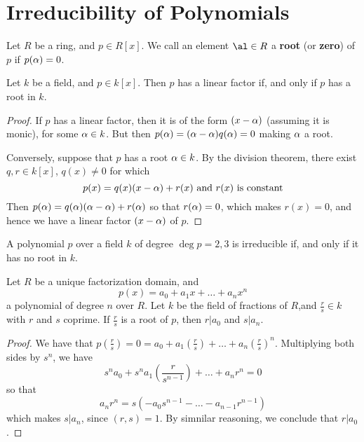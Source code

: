 \section{Irreducibility of Polynomials}
\label{section_7.3}

\begin{definition}
    Let $R$ be a ring, and  $p \in R[x]$. We call an element $\al \in R$ a
    \textbf{root} (or \textbf{zero}) of $p$ if  $p(\alpha)=0$.
\end{definition}

\begin{lemma}\label{lemma_7.3.1}
    Let $k$ be a field, and  $p \in k[x]$. Then $p$ has a linear factor if, and
    only if  $p$ has a root in  $k$.
\end{lemma}
\begin{proof}
    If $p$ has a linear factor, then it is of the form  $(x-\alpha)$ (assuming it is
    monic), for some $\alpha \in k$. But then  $p(\alpha)=(\alpha-\alpha)q(\alpha)=0$ making $\alpha$ a
    root.

    Conversely, suppose that $p$ has a root  $\alpha \in k$. By the division
    theorem, there exist $q, r \in k[x]$, $q(x) \neq 0$ for which
    \begin{equation*}
        p(x)=q(x)(x-\alpha)+r(x) \text{ and } r(x) \text{ is constant}
    \end{equation*}
    Then $p(\alpha)=q(\alpha)(\alpha-\alpha)+r(\alpha)$ so that $r(\alpha)=0$, which makes $r(x)=0$, and
    hence we have a linear factor $(x-\alpha)$ of $p$.
\end{proof}

\begin{lemma}\label{lemma_7.3.2}
    A polynomial $p$ over a field $k$ of degree $\deg{p}=2,3$ is irreducible if,
    and only if it has no root in $k$.
\end{lemma}

\begin{lemma}\label{lemma_7.3.3}
    Let $R$ be a unique factorization domain, and
    \begin{equation*}
        p(x)=a_0+a_1x+\dots+a_nx^n
    \end{equation*}
    a polynomial of degree $n$ over $R$. Let $k$ be the field of fractions of
    $R$,and $\frac{r}{s} \in k$ with $r$ and $s$ coprime. If $\frac{r}{s}$ is a
    root of $p$, then  $r|a_0$ and $s|a_n$.
\end{lemma}
\begin{proof}
    We have that
    $p(\frac{r}{s})=0=a_0+a_1(\frac{r}{s})+\dots+a_n(\frac{r}{s})^n$.
    Multiplying both sides by $s^n$, we have
    \begin{equation*}
        s^na_0+s^na_1(\frac{r}{s^{n-1}})+\dots+a_nr^n=0
    \end{equation*}
    so that
    \begin{equation*}
        a_nr^n=s(-a_0s^{n-1}- \dots -a_{n-1}r^{n-1})
    \end{equation*}
    which makes $s|a_n$, since $(r,s)=1$. By simnilar reasoning, we conclude that
    $r|a_0$.
\end{proof}

